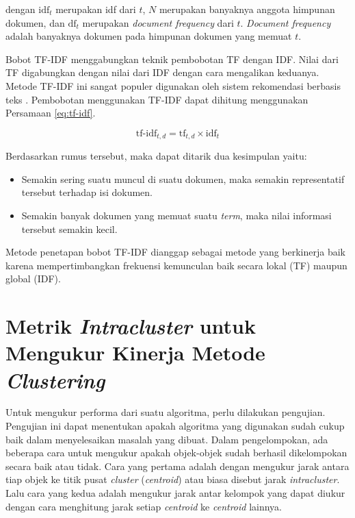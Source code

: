 dengan $\textrm{idf}_t$ merupakan idf dari \term $t$, $N$ merupakan banyaknya anggota himpunan dokumen, dan $\textrm{df}_t$ merupakan \textit{document frequency} dari \term $t$. \textit{Document frequency} adalah banyaknya dokumen pada himpunan dokumen yang memuat \term $t$.

Bobot TF-IDF menggabungkan teknik pembobotan TF dengan IDF. Nilai dari TF digabungkan dengan nilai dari IDF dengan cara mengalikan keduanya. Metode TF-IDF ini sangat populer digunakan oleh sistem rekomendasi berbasis teks \cite{aizawa2003information}. Pembobotan menggunakan TF-IDF dapat dihitung menggunakan Persamaan \ref{eq:tf-idf}.

\begin{equation}
	\label{eq:tf-idf}
	\textrm{tf-idf}_{t,d} = \textrm{tf}_{t,d} \times \textrm{idf}_t
\end{equation}

Berdasarkan rumus tersebut, maka dapat ditarik dua kesimpulan yaitu:
\begin{itemize}
	\item Semakin sering suatu \term muncul di suatu dokumen, maka semakin representatif \term tersebut terhadap isi dokumen.
	\item Semakin banyak dokumen yang memuat suatu \textit{term}, maka nilai informasi \term tersebut semakin kecil. %
\end{itemize}

Metode penetapan bobot TF-IDF dianggap sebagai metode yang berkinerja baik karena mempertimbangkan frekuensi kemunculan \term baik secara lokal (TF) maupun global (IDF).

\section{Metrik \textit{Intracluster} untuk Mengukur Kinerja Metode \textit{Clustering}}
\label{sec:metric}
Untuk mengukur performa dari suatu algoritma, perlu dilakukan pengujian. Pengujian ini dapat menentukan apakah algoritma yang digunakan sudah cukup baik dalam menyelesaikan masalah yang dibuat. Dalam pengelompokan, ada beberapa cara untuk mengukur apakah objek-objek sudah berhasil dikelompokan secara baik atau tidak. Cara yang pertama adalah dengan mengukur jarak antara tiap objek ke titik pusat \textit{cluster} (\textit{centroid}) atau biasa disebut jarak \textit{intracluster}. Lalu cara yang kedua adalah mengukur jarak antar kelompok yang dapat diukur dengan cara menghitung jarak setiap \textit{centroid} ke \textit{centroid} lainnya.

